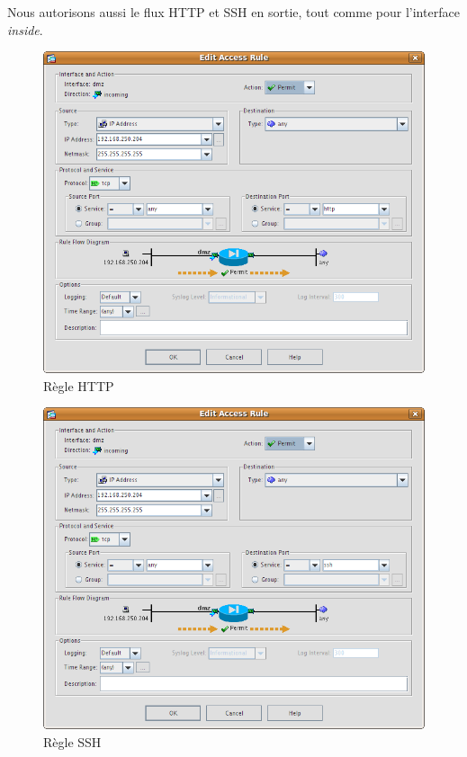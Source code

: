 \documentclass[a4paper,12pt]{article}
\begin{document}
Nous autorisons aussi le flux HTTP et SSH en sortie, tout comme pour l'interface \textit{inside}.
\begin{figure}[H]
	\center
	\includegraphics[width=12cm]{img/13-policydmzhttpany.png}
	\caption{Règle HTTP}
\end{figure}
\begin{figure}[H]
	\center
	\includegraphics[width=12cm]{img/14-policydmzsshany.png}
	\caption{Règle SSH}
\end{figure}
\end{document}
